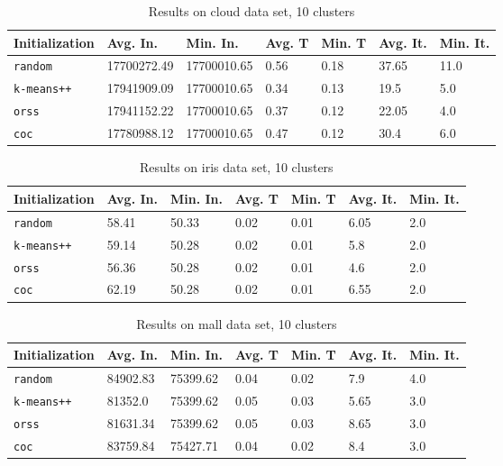 \documentclass[twoside, 11pt]{article}
\begin{document}
		\begin{table}[p]
			\begin{center}
				\begin{tabular}{|l|l|l|l|l|l|l|}
					\hline
					Initialization & Avg. In. & Min. In. & Avg. T & Min. T & Avg. It. & Min. It.\\\hline
					\texttt{random} & 17700272.49 & 17700010.65 & 0.56 & 0.18 & 37.65 & 11.0\\\hline
					\texttt{k-means++} & 17941909.09 & 17700010.65 & 0.34 & 0.13 & 19.5 & 5.0\\\hline
					\texttt{orss} & 17941152.22 & 17700010.65 & 0.37 & 0.12 & 22.05 & 4.0\\\hline
					\texttt{coc} & 17780988.12 & 17700010.65 & 0.47 & 0.12 & 30.4 & 6.0\\\hline
				\end{tabular}
				\caption{Results on cloud data set, 10 clusters}
				\label{tbl:cloud10}
			\end{center}
		\end{table}
		
		\begin{table}[p]
			\begin{center}
				\begin{tabular}{|l|l|l|l|l|l|l|}
					\hline
					Initialization & Avg. In. & Min. In. & Avg. T & Min. T & Avg. It. & Min. It.\\\hline
					\texttt{random} & 58.41 & 50.33 & 0.02 & 0.01 & 6.05 & 2.0\\\hline
					\texttt{k-means++} & 59.14 & 50.28 & 0.02 & 0.01 & 5.8 & 2.0\\\hline
					\texttt{orss} & 56.36 & 50.28 & 0.02 & 0.01 & 4.6 & 2.0\\\hline
					\texttt{coc} & 62.19 & 50.28 & 0.02 & 0.01 & 6.55 & 2.0\\\hline
				\end{tabular}
				\caption{Results on iris data set, 10 clusters}
				\label{tbl:iris10}
			\end{center}
		\end{table}
		
		\begin{table}[p]
			\begin{center}
				\begin{tabular}{|l|l|l|l|l|l|l|}
					\hline
					Initialization & Avg. In. & Min. In. & Avg. T & Min. T & Avg. It. & Min. It.\\\hline
					\texttt{random} & 84902.83 & 75399.62 & 0.04 & 0.02 & 7.9 & 4.0\\\hline
					\texttt{k-means++} & 81352.0 & 75399.62 & 0.05 & 0.03 & 5.65 & 3.0\\\hline
					\texttt{orss} & 81631.34 & 75399.62 & 0.05 & 0.03 & 8.65 & 3.0\\\hline
					\texttt{coc} & 83759.84 & 75427.71 & 0.04 & 0.02 & 8.4 & 3.0\\\hline
				\end{tabular}
				\caption{Results on mall data set, 10 clusters}
				\label{tbl:mall10}
			\end{center}
		\end{table}
		
\end{document}
